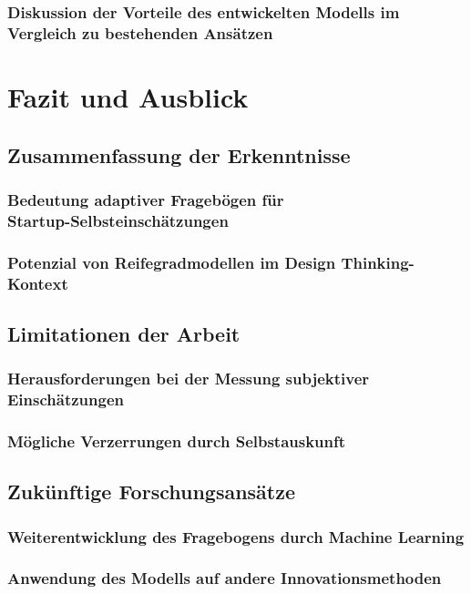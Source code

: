 \subsection{Diskussion der Vorteile des entwickelten Modells im Vergleich zu bestehenden Ansätzen}

\chapter{Fazit und Ausblick}

\section{Zusammenfassung der Erkenntnisse}
\subsection{Bedeutung adaptiver Fragebögen für \\ Startup-Selbsteinschätzungen}
\subsection{Potenzial von Reifegradmodellen im Design Thinking-Kontext}

\section{Limitationen der Arbeit}
\subsection{Herausforderungen bei der Messung subjektiver Einschätzungen}
\subsection{Mögliche Verzerrungen durch Selbstauskunft}

\section{Zukünftige Forschungsansätze}
\subsection{Weiterentwicklung des Fragebogens durch Machine Learning}
\subsection{Anwendung des Modells auf andere Innovationsmethoden}